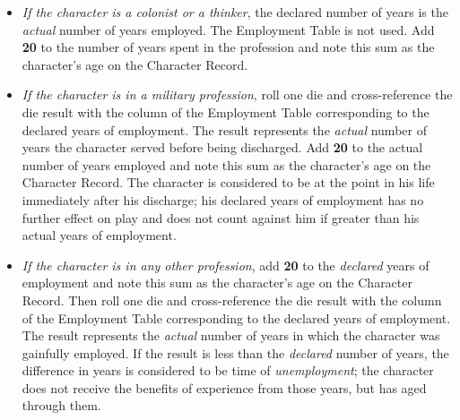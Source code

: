 \begin{itemize}
\item \emph{If the character is a colonist or a thinker}, the declared
  number of years is the \emph{actual} number of years employed. The
  Employment Table is not used. Add \textbf{20} to the number of years
  spent in the profession and note this sum as the character's age on
  the Character Record.
\item \emph{If the character is in a military profession}, roll one
  die and cross-reference the die result with the column of the
  Employment Table corresponding to the declared years of employment.
  The result represents the \emph{actual} number of years the
  character served before being discharged. Add \textbf{20} to the actual
  number of years employed and note this sum as the character's age on
  the Character Record. The character is considered to be at the point
  in his life immediately after his discharge; his declared years of
  employment has no further effect on play and does not count against
  him if greater than his actual years of employment.
\item \emph{If the character is in any other profession}, add
  \textbf{20} to the \emph{declared} years of employment and note this
  sum as the character's age on the Character Record. Then roll one
  die and cross-reference the die result with the column of the
  Employment Table corresponding to the declared years of employment.
  The result represents the \emph{actual} number of years in which the
  character was gainfully employed. If the result is less than the
  \emph{declared} number of years, the difference in years is
  considered to be time of \emph{unemployment}; the character does not
  receive the benefits of experience from those years, but has aged
  through them.
\end{itemize}

